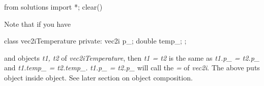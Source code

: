 \begin{python0}
from solutions import *; clear()
\end{python0}

Note that if you have

\begin{consolethree}[escapeinside=||]
class vec2iTemperature
{
private:
    vec2i p_;
    double temp_;
};
\end{consolethree}

and objects \textit{t1, t2} of \textit{vec2iTemperature}, then \textit{t1 =
t2} is the same as \textit{t1.p\_ = t2.p\_} and \textit{t1.temp\_ =
t2.temp\_}. \textit{t1.p\_ = t2.p\_} will call the \textit{=} of
\textit{vec2i}. The above puts object inside object. See later section on
object composition.


